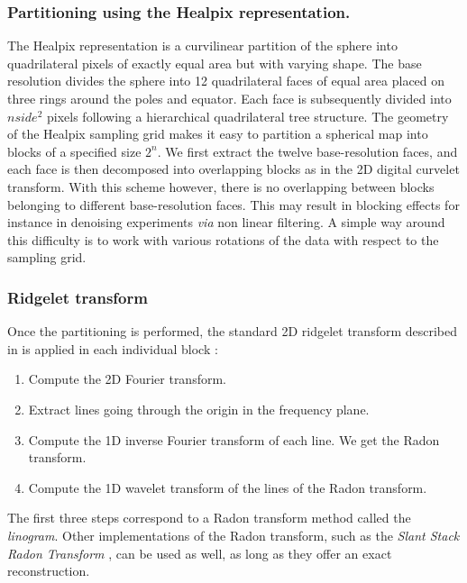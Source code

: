 \subsubsection*{Partitioning using the Healpix representation.}
The Healpix representation is a curvilinear partition of the sphere into quadrilateral pixels of exactly equal area but with varying shape. The base 
resolution divides the sphere into 12 quadrilateral faces of equal area placed on three rings around the poles and equator. Each face is subsequently 
divided into $nside^{2}$ pixels following a hierarchical quadrilateral tree structure. The geometry of the Healpix sampling grid makes it easy to 
partition a spherical map into blocks of a specified size $2^n$. We first extract the twelve base-resolution faces, and each face is then decomposed 
into overlapping blocks as in the 2D digital curvelet transform. With this scheme however, there is no overlapping between blocks belonging to different 
base-resolution faces. This may result in blocking effects for instance in denoising experiments \emph{via} non linear filtering. A simple way around 
this difficulty is to work with various rotations of the data with respect to the sampling grid. 

\subsubsection*{Ridgelet transform}
Once the partitioning is performed, the standard 2D ridgelet transform described in \cite{starck:sta02_3} is applied in each individual block :
\begin{enumerate}
\item Compute the 2D Fourier transform.
\item Extract lines going through the origin in the frequency plane.
\item Compute the 1D inverse Fourier transform of each line. We get the Radon transform.
\item Compute the 1D wavelet transform of the lines of the Radon transform.
\end{enumerate}
The first three steps correspond to a Radon transform method called the {\it linogram}. Other implementations of the Radon transform, such as 
the {\it Slant Stack Radon Transform} \cite{cur:donoho_02}, can be used as well, as long as they offer an exact reconstruction.
   
